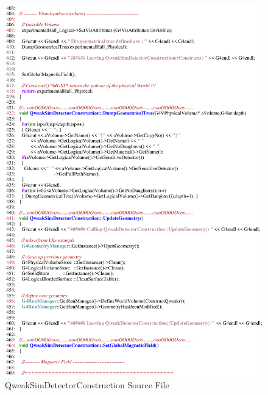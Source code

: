 \begin{figure}[ht]
  \hspace{0cm}
  \includegraphics[scale=0.8]{./figures4/QweakSimDetectorConstruction.cc-p7.eps}
  \caption{QweakSimDetectorConstruction Source File}
           \label{fig:V-SC-11}
\end{figure}
\clearpage

